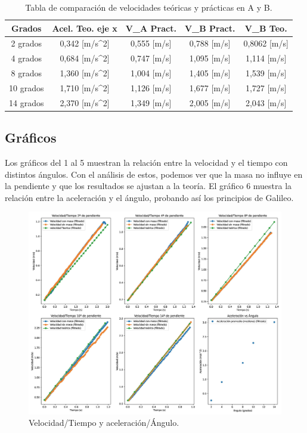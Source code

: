 \documentclass[twocolumn,12pt]{article}
\begin{document}
        \begin{table}[h!]
		\centering

		\begin{tabular}{|c|c|c|c|c|}
			\hline
			\rowcolor{white} %
			Grados & Acel. Teo. eje x & V_{A} Pract.  & V_{B} Pract. & V_{B} Teo. \\ \hline
			2 grados & 0,342 [m/s^{2}] & 0,555 [m/s] & 0,788 [m/s] & 0,8062 [m/s] \\ \hline
			4 grados & 0,684 [m/s^{2}] & 0,747 [m/s] & 1,095 [m/s] & 1,114 [m/s] \\ \hline
			8 grados & 1,360 [m/s^{2}] & 1,004 [m/s] & 1,405 [m/s] & 1,539 [m/s] \\ \hline
			10 grados & 1,710 [m/s^{2}] & 1,126 [m/s] & 1,677 [m/s] & 1,727 [m/s] \\ \hline
			14 grados & 2,370 [m/s^{2}] & 1,349 [m/s] & 2,005 [m/s] & 2,043 [m/s] \\ \hline
		\end{tabular}
		\caption{Tabla de comparación de velocidades teóricas y prácticas en A y B.}
		\label{tabla:caida_galileo}
	\end{table}

    \onecolumn
    \subsection{Gráficos}

    Los gráficos del 1 al 5 muestran la relación entre la velocidad y el tiempo con distintos ángulos. Con el análisis de estos, podemos ver que la masa no influye en la pendiente y que los resultados se ajustan a la teoría.
    El gráfico 6 muestra la relación entre la aceleración y el ángulo, probando así los principios de Galileo.
    
    
    \begin{figure}[h]
        \centering
        \includegraphics[width=1\textwidth]{Lab1/Multimedia/grafico1.jpg}
        \caption{Velocidad/Tiempo y aceleración/Ángulo.}
        \label{fig:imagen}
    \end{figure}
\end{document}
